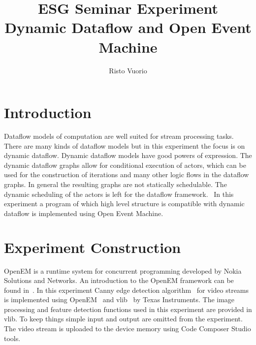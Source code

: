 \documentclass[a4paper,10pt]{article}
\begin{document}
%
\title{ESG Seminar Experiment \\ Dynamic Dataflow and Open Event Machine}

\author{Risto Vuorio}

\maketitle

\begin{abstract}
\end{abstract}

\section{Introduction}
Dataflow models of computation are well suited for stream processing tasks. There are many kinds of dataflow models but in this experiment the focus is on dynamic dataflow. Dynamic dataflow models have good powers of expression. The dynamic dataflow graphs allow for conditional execution of actors, which can be used for the construction of iterations and many other logic flows in the dataflow graphs. In general the resulting graphs are not statically schedulable. The dynamic scheduling of the actors is left for the dataflow framework.~\cite{risto-semma} In this experiment a program of which high level structure is compatible with dynamic dataflow is implemented using Open Event Machine.

\section{Experiment Construction}
OpenEM is a runtime system for concurrent programming developed by Nokia Solutions and Networks. An introduction to the OpenEM framework can be found in~\cite{risto-dippa}. In this experiment Canny edge detection algorithm~\cite{canny1986computational} for video streams is implemented using OpenEM~\cite{openemwhite} and vlib~\cite{vlib} by Texas Instruments. The image processing and feature detection functions used in this experiment are provided in vlib. To keep things simple input and output are omitted from the experiment. The video stream is uploaded to the device memory using Code Composer Studio tools.
\end{document}
